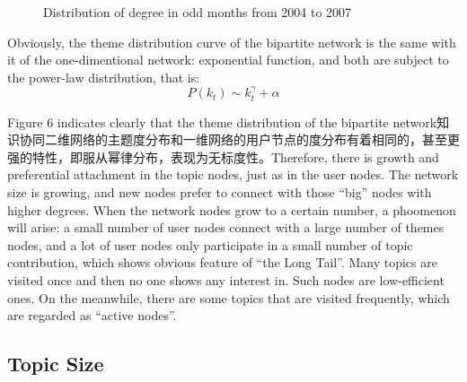 \documentclass{elsarticle}
\begin{document}
\begin{figure}[p]
  \centering
  \subfigure[a]{
     \scalebox{0.3}{\texttt{[image: 06-1]}}
   } \quad
  \subfigure[b]{ 
       \scalebox{0.3}{\texttt{[image: 06-2]}}
   } 
   \end{figure}
   \begin{figure}[p]
    \subfigure[c]{
     \scalebox{0.3}{\texttt{[image: 06-3]}}
   } \quad
  \subfigure[d]{ 
       \scalebox{0.3}{\texttt{[image: 06-4]}}
   } 
    \end{figure}
   \begin{figure}[p]
    \subfigure[e]{
     \scalebox{0.3}{\texttt{[image: 06-5]}}
   } \quad
  \subfigure[f]{ 
       \scalebox{0.3}{\texttt{[image: 06-6]}}
   } 
 \end{figure}
   \begin{figure}[p]
    \subfigure[g]{
     \scalebox{0.3}{\texttt{[image: 06-7]}}
   } \quad
  \subfigure[h]{ 
       \scalebox{0.3}{\texttt{[image: 06-8]}}
   } 
   \caption{Distribution of degree in odd months from 2004 to 2007}
\end{figure}

Obviously, the theme distribution curve of the bipartite network is the same with it of the one-dimentional network: exponential function, and both are subject to the power-law distribution, that is: 
\begin{equation}
  \label{eq:2}
  P(k_t)\sim k_t^{\gamma}+\alpha
\end{equation}

Figure 6 indicates clearly that the theme distribution of the bipartite network知识协同二维网络的主题度分布和一维网络的用户节点的度分布有着相同的，甚至更强的特性，即服从幂律分布，表现为无标度性。Therefore, there is growth and preferential attachment in the topic nodes, just as in the user nodes. The network size is growing, and new nodes prefer to connect with those “big” nodes with higher degrees. When the network nodes grow to a certain number, a phoomenon will arise: a small number of user nodes connect with a large number of themes nodes, and a lot of user nodes only participate in a small number of topic contribution, which shows obvious feature of “the Long Tail”. Many topics are visited once and then no one shows any interest in. Such nodes are low-efficient ones. On the meanwhile, there are some topics that are visited frequently, which are regarded as “active nodes”. 

\subsection{Topic Size}
\label{sec:topic-size}
\end{document}
